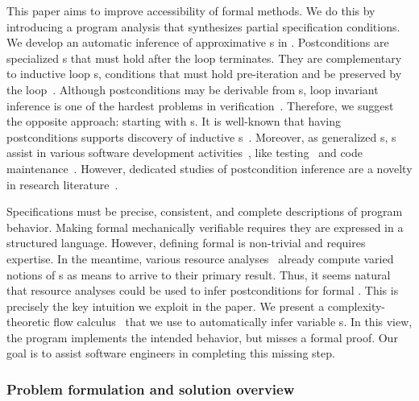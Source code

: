 This paper aims to improve accessibility of formal methods. We do this by
introducing a program analysis that synthesizes partial specification
conditions. We develop an automatic inference of approximative
s in . Postconditions are specialized
s that must hold after the loop terminates.
They are complementary to inductive loop s, \ie conditions that must hold pre-iteration and be
preserved by the loop~\cite{sankaranarayanan2004}. Although postconditions may
be derivable from s, loop invariant
inference is one of the hardest problems in
verification~\cite{dillig2013,si2018}. Therefore, we suggest the opposite
approach: starting with s. It is well-known that having
postconditions supports discovery of inductive
s~\cite{furia2010}. Moreover, as
generalized s, s assist
in various software development activities~\cite{nguyen2022}, like
testing~\cite{alagarsamy2024,zhang2015} and code
maintenance~\cite{rosenblum1995}. However, dedicated studies of postcondition
inference are a novelty in research literature~\cite{popeea2006,molina2021}.

Specifications must be precise, consistent, and complete
descriptions of program behavior. Making formal 
mechanically verifiable requires they are expressed in a structured language.
However, defining formal  is non-trivial and requires
expertise. In the meantime, various resource
analyses~\cite{jones2009,brockschmidt2016} already
compute varied notions of s as means to arrive to their
primary result. Thus, it seems natural that {resource analyses could be used to
infer postconditions} for formal . This is precisely the key
intuition we exploit in the paper. We present a complexity\hyp{}theoretic flow
calculus~\cite{jones2009,aubert20222} that we use to
automatically infer variable s. In this view, the program
implements the intended behavior, but misses a formal proof. Our goal is to
assist software engineers in completing this missing step.

\subsubsection{Problem formulation and solution overview}
\label{subsec:overview}

